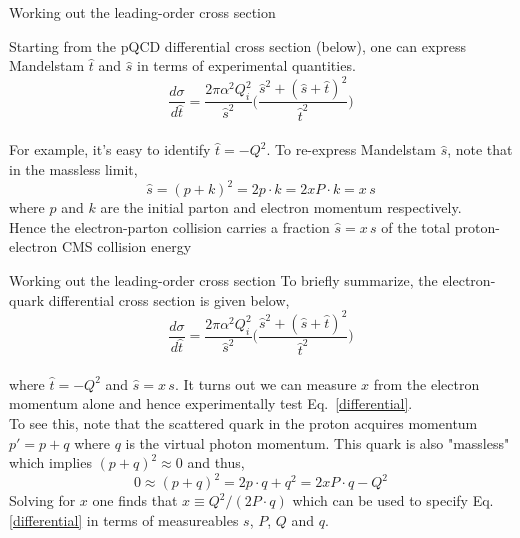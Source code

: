 \documentclass[svgnames]{beamer}
\begin{document}
\begin{frame}{Working out the leading-order cross section}

    Starting from the pQCD differential cross section (below), one can express Mandelstam $\hat{t}$ and $\hat{s}$ in terms of experimental quantities. 
    \begin{equation*}
        \frac{d\sigma}{d\hat{t}} = \frac{2\pi \alpha^2 Q_i^2}{\hat{s}^2} \Big( \frac{\hat{s}^2 + (\hat{s}+\hat{t})^2}{\hat{t}^2} \Big)
    \end{equation*} \\
    \medskip For example, it's easy to identify $\hat{t}=-Q^2$. To re-express Mandelstam $\hat{s}$, note that in the massless limit, 
    \begin{equation*}
        \hat{s} = (p + k)^2 = 2 p \cdot k = 2 x P \cdot k = x\, s
    \end{equation*}
    where $p$ and $k$ are the initial parton and electron momentum respectively. \bigskip \\
    Hence the electron-parton collision carries a fraction $\hat{s} = x\, s$ of the total proton-electron CMS collision energy
\end{frame}

\begin{frame}{Working out the leading-order cross section}
To briefly summarize, the electron-quark differential cross section is given below, 
    \begin{equation}
        \label{differential}
        \frac{d\sigma}{d\hat{t}} = \frac{2\pi \alpha^2 Q_i^2}{\hat{s}^2} \Big( \frac{\hat{s}^2 + (\hat{s}+\hat{t})^2}{\hat{t}^2} \Big)
    \end{equation} \\
    where $\hat{t} = -Q^2$ and $\hat{s} = x\, s$. It turns out we can measure $x$ from the electron momentum alone and hence experimentally test Eq.~\eqref{differential}. \bigskip \\

  To see this, note that the scattered quark in the proton acquires momentum $p' = p+q$ where $q$ is the virtual photon momentum. This quark is also "massless" which implies $(p + q)^2 \approx 0$ and thus, \\
\begin{equation*}
    0 \approx (p+q)^2 = 2p \cdot q + q^2 = 2xP \cdot q - Q^2
\end{equation*}
Solving for $x$ one finds that $x \equiv Q^2 / (2 P \cdot q)$ which can be used to specify Eq.\eqref{differential} in terms of measureables $s$, $P$, $Q$ and $q$.

\end{frame}
\end{document}
